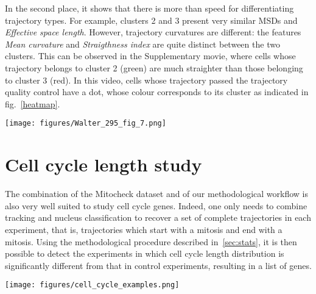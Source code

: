 In the second place, it shows that there is more than speed for
differentiating trajectory types. For example, clusters 2 and 3
present very similar MSDs and \textit{Effective space
  length}. However, trajectory curvatures are different: the features
\textit{Mean curvature} and \textit{Straigthness index} are quite
distinct between the two clusters. This can be observed in the
Supplementary movie, where cells whose trajectory belongs to cluster 2
(green) are much straighter than those belonging to cluster 3
(red). In this video, cells whose trajectory passed the trajectory
quality control have a dot, whose colour corresponds to its cluster as
indicated in fig.~\ref{heatmap}. 

\begin{figure*}[t!]
\centerline{\texttt{[image: figures/Walter\_295\_fig\_7.png]}}
\caption{Characterization of our ontology of trajectories. Each column is a single cell trajectory ; trajectories are grouped by cluster label. 1,000 trajectories were randomly selected per trajectory cluster.}
\label{heatmap}
\end{figure*}
\section{Cell cycle length study}
\label{sec:cellcycle}
The combination of the Mitocheck dataset and of our methodological
workflow is also very well suited to study cell cycle genes. Indeed,
one only needs to combine tracking and nucleus classification to
recover a set of complete trajectories in each experiment, that is,
trajectories which start with a mitosis and end with a mitosis. Using
the methodological procedure described in~\ref{sec:stats}, it is then
possible to detect the experiments in which cell cycle length
distribution is significantly different from that in control
experiments, resulting in a list of genes. 
\begin{figure*}[ht!]
\centerline{\texttt{[image: figures/cell\_cycle\_examples.png]}}
\caption{Examples of object divisions from the Mitocheck dataset}
\label{cellcycle2}
\end{figure*}
